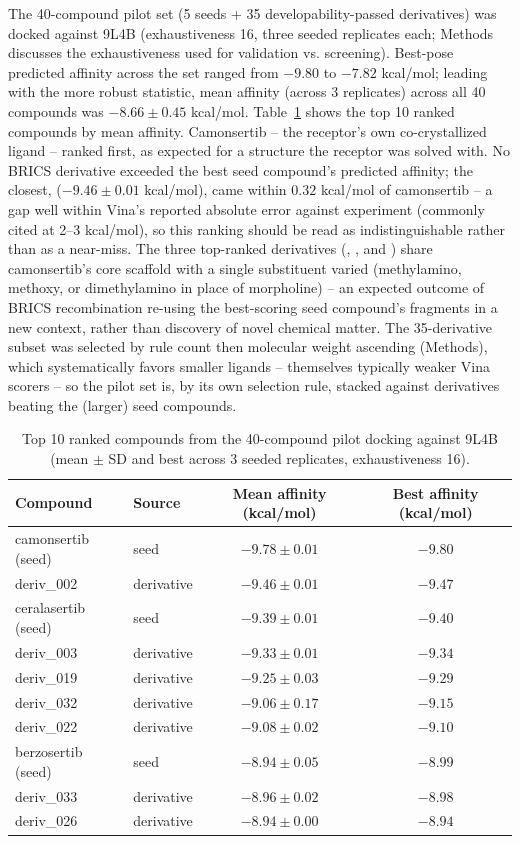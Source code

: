 \documentclass[11pt]{article}
\begin{document}
The 40-compound pilot set (5 seeds + 35 developability-passed derivatives)
was docked against 9L4B (exhaustiveness 16, three seeded replicates each;
Methods discusses the exhaustiveness used for validation vs. screening).
Best-pose predicted affinity across the set ranged from $-9.80$ to
$-7.82$ kcal/mol; leading with the more robust statistic, mean affinity
(across 3 replicates) across all 40 compounds was $-8.66\pm0.45$ kcal/mol.
Table~\ref{tab:docking} shows the top 10 ranked compounds by mean affinity.
Camonsertib -- the receptor's own co-crystallized ligand -- ranked first,
as expected for a structure the receptor was solved with. No BRICS
derivative exceeded the best seed compound's predicted affinity; the
closest,  ($-9.46\pm0.01$ kcal/mol), came within
$0.32$ kcal/mol of camonsertib -- a gap well within Vina's reported
absolute error against experiment (commonly cited at 2--3 kcal/mol), so
this ranking should be read as indistinguishable rather than as a
near-miss. The three top-ranked derivatives (,
, and ) share camonsertib's core
scaffold with a single substituent varied (methylamino, methoxy, or
dimethylamino in place of morpholine) -- an expected outcome of BRICS
recombination re-using the best-scoring seed compound's fragments in a new
context, rather than discovery of novel chemical matter. The 35-derivative
subset was selected by rule count then molecular weight ascending (Methods),
which systematically favors smaller ligands -- themselves typically weaker
Vina scorers -- so the pilot set is, by its own selection rule, stacked
against derivatives beating the (larger) seed compounds.

\begin{table}[htbp]
\centering
\caption{Top 10 ranked compounds from the 40-compound pilot docking against 9L4B (mean $\pm$ SD and best across 3 seeded replicates, exhaustiveness 16).}
\label{tab:docking}
\small
\begin{tabular}{llcc}
\toprule
Compound & Source & Mean affinity (kcal/mol) & Best affinity (kcal/mol) \\
\midrule
camonsertib (seed) & seed       & $-9.78 \pm 0.01$ & $-9.80$ \\
deriv\_002          & derivative & $-9.46 \pm 0.01$ & $-9.47$ \\
ceralasertib (seed) & seed       & $-9.39 \pm 0.01$ & $-9.40$ \\
deriv\_003          & derivative & $-9.33 \pm 0.01$ & $-9.34$ \\
deriv\_019          & derivative & $-9.25 \pm 0.03$ & $-9.29$ \\
deriv\_032          & derivative & $-9.06 \pm 0.17$ & $-9.15$ \\
deriv\_022          & derivative & $-9.08 \pm 0.02$ & $-9.10$ \\
berzosertib (seed)  & seed       & $-8.94 \pm 0.05$ & $-8.99$ \\
deriv\_033          & derivative & $-8.96 \pm 0.02$ & $-8.98$ \\
deriv\_026          & derivative & $-8.94 \pm 0.00$ & $-8.94$ \\
\bottomrule
\end{tabular}
\end{table}
\end{document}
